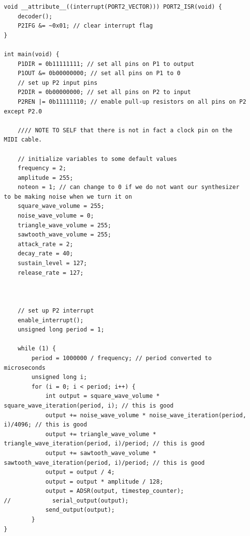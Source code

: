 \documentclass[10pt]{article}
\begin{document}
\begin{lstlisting}
void __attribute__((interrupt(PORT2_VECTOR))) PORT2_ISR(void) {
    decoder();
    P2IFG &= ~0x01; // clear interrupt flag
}

int main(void) {
    P1DIR = 0b11111111; // set all pins on P1 to output
    P1OUT &= 0b00000000; // set all pins on P1 to 0
    // set up P2 input pins
    P2DIR = 0b00000000; // set all pins on P2 to input
    P2REN |= 0b11111110; // enable pull-up resistors on all pins on P2 except P2.0

    //// NOTE TO SELF that there is not in fact a clock pin on the MIDI cable.

    // initialize variables to some default values
    frequency = 2;
    amplitude = 255;
    noteon = 1; // can change to 0 if we do not want our synthesizer to be making noise when we turn it on
    square_wave_volume = 255;
    noise_wave_volume = 0;
    triangle_wave_volume = 255;
    sawtooth_wave_volume = 255;
    attack_rate = 2;
    decay_rate = 40;
    sustain_level = 127;
    release_rate = 127;



    // set up P2 interrupt
    enable_interrupt();
    unsigned long period = 1;
    
    while (1) {
        period = 1000000 / frequency; // period converted to microseconds
        unsigned long i;
        for (i = 0; i < period; i++) {
            int output = square_wave_volume * square_wave_iteration(period, i); // this is good
            output += noise_wave_volume * noise_wave_iteration(period, i)/4096; // this is good
            output += triangle_wave_volume * triangle_wave_iteration(period, i)/period; // this is good
            output += sawtooth_wave_volume * sawtooth_wave_iteration(period, i)/period; // this is good
            output = output / 4;
            output = output * amplitude / 128;
            output = ADSR(output, timestep_counter);
//            serial_output(output);
            send_output(output);
        }
}
\end{lstlisting}
\end{document}
